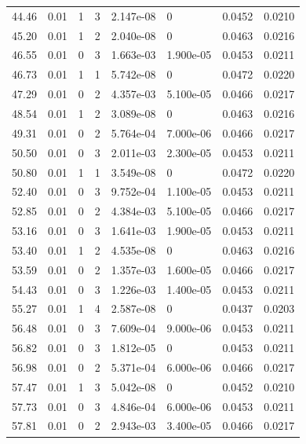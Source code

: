 \documentclass[preview]{standalone}
\begin{document}
{{{\begin{tabular}{L{1.2cm}C{1.2cm} C{0.3cm}C{0.5cm} C{1.4cm}C{1.4cm} C{1.4cm}C{1.4cm}}
  44.46  &  0.01  & 1     &  3 &  2.147e-08  & 0  & 0.0452 &  0.0210   \\ 
  45.20  &  0.01  & 1     &  2 &  2.040e-08  & 0  & 0.0463 &  0.0216   \\ 
  46.55  &  0.01  & 0     &  3 &  1.663e-03  & 1.900e-05  & 0.0453 &  0.0211   \\ 
  46.73  &  0.01  & 1     &  1 &  5.742e-08  & 0  & 0.0472 &  0.0220   \\ 
  47.29  &  0.01  & 0     &  2 &  4.357e-03  & 5.100e-05  & 0.0466 &  0.0217   \\ 
  48.54  &  0.01  & 1     &  2 &  3.089e-08  & 0  & 0.0463 &  0.0216   \\ 
  49.31  &  0.01  & 0     &  2 &  5.764e-04  & 7.000e-06  & 0.0466 &  0.0217   \\ 
  50.50  &  0.01  & 0     &  3 &  2.011e-03  & 2.300e-05  & 0.0453 &  0.0211   \\ 
  50.80  &  0.01  & 1     &  1 &  3.549e-08  & 0  & 0.0472 &  0.0220   \\ 
  52.40  &  0.01  & 0     &  3 &  9.752e-04  & 1.100e-05  & 0.0453 &  0.0211   \\ 
  52.85  &  0.01  & 0     &  2 &  4.384e-03  & 5.100e-05  & 0.0466 &  0.0217   \\ 
  53.16  &  0.01  & 0     &  3 &  1.641e-03  & 1.900e-05  & 0.0453 &  0.0211   \\ 
  53.40  &  0.01  & 1     &  2 &  4.535e-08  & 0  & 0.0463 &  0.0216   \\ 
  53.59  &  0.01  & 0     &  2 &  1.357e-03  & 1.600e-05  & 0.0466 &  0.0217   \\ 
  54.43  &  0.01  & 0     &  3 &  1.226e-03  & 1.400e-05  & 0.0453 &  0.0211   \\ 
  55.27  &  0.01  & 1     &  4 &  2.587e-08  & 0  & 0.0437 &  0.0203   \\ 
  56.48  &  0.01  & 0     &  3 &  7.609e-04  & 9.000e-06  & 0.0453 &  0.0211   \\ 
  56.82  &  0.01  & 0     &  3 &  1.812e-05  & 0  & 0.0453 &  0.0211   \\ 
  56.98  &  0.01  & 0     &  2 &  5.371e-04  & 6.000e-06  & 0.0466 &  0.0217   \\ 
  57.47  &  0.01  & 1     &  3 &  5.042e-08  & 0  & 0.0452 &  0.0210   \\ 
  57.73  &  0.01  & 0     &  3 &  4.846e-04  & 6.000e-06  & 0.0453 &  0.0211   \\ 
  57.81  &  0.01  & 0     &  2 &  2.943e-03  & 3.400e-05  & 0.0466 &  0.0217   \\ 

\end{tabular}}}}
\end{document}
